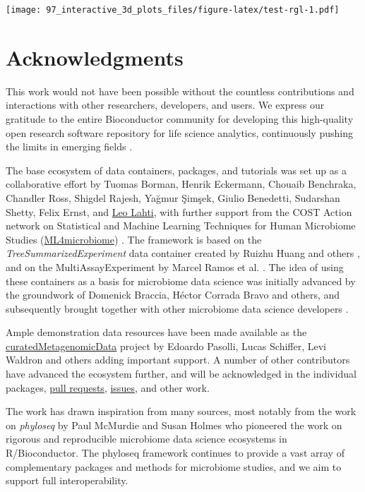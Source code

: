 \documentclass[
]{book}
\begin{document}
\texttt{[image: 97\_interactive\_3d\_plots\_files/figure-latex/test-rgl-1.pdf]}

\hypertarget{acknowledgments}{%
\chapter{Acknowledgments}\label{acknowledgments}}

This work would not have been possible without the countless
contributions and interactions with other researchers, developers, and
users. We express our gratitude to the entire Bioconductor community
for developing this high-quality open research software repository for
life science analytics, continuously pushing the limits in emerging
fields \citep[\citet{Huber2015}]{Gentleman2004}.

The base ecosystem of data containers, packages, and tutorials was set
up as a collaborative effort by Tuomas Borman, Henrik Eckermann,
Chouaib Benchraka, Chandler Ross, Shigdel Rajesh, Yağmur Şimşek,
Giulio Benedetti, Sudarshan Shetty, Felix Ernst, and \href{http://www.iki.fi/Leo.Lahti}{Leo
Lahti}, with further support from the
COST Action network on Statistical and Machine Learning Techniques for
Human Microbiome Studies
(\href{https://www.ml4microbiome.eu/}{ML4microbiome})
\citep{MorenoIndias2021}. The framework is based on the
\emph{TreeSummarizedExperiment} data container created by Ruizhu Huang and
others \citep{R-TreeSummarizedExperiment}, and on the MultiAssayExperiment
by Marcel Ramos et al. \citep{MultiAssayExperiment2017}. The idea of using
these containers as a basis for microbiome data science was initially
advanced by the groundwork of Domenick Braccia, Héctor Corrada Bravo
and others, and subsequently brought together with other microbiome
data science developers \citep{Shetty2019}.

Ample demonstration data resources have been made available as the
\href{https://waldronlab.io/curatedMetagenomicData/}{curatedMetagenomicData}
project by Edoardo Pasolli, Lucas Schiffer, Levi Waldron and others
\citep{Pasolli2017} adding important support.
A number of other contributors have advanced the ecosystem
further, and will be acknowledged in the individual
packages, \href{https://github.com/microbiome/OMA/graphs/contributors}{pull
requests},
\href{https://github.com/microbiome/OMA/issues}{issues}, and other work.

The work has drawn inspiration from many sources, most notably from
the work on \emph{phyloseq} by Paul McMurdie and Susan Holmes
\citep{McMurdie2013} who pioneered the work on rigorous and reproducible
microbiome data science ecosystems in R/Bioconductor. The phyloseq
framework continues to provide a vast array of complementary packages
and methods for microbiome studies, and we aim to support full
interoperability.
\end{document}
